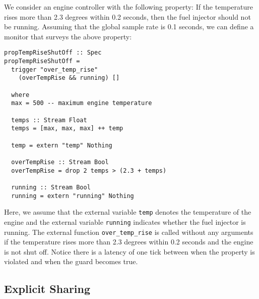 \begin{example}
\label{exm:engine}
We consider an engine controller with the following property: If the temperature
rises more than 2.3 degrees within 0.2 seconds, then the fuel injector should
not be running.  Assuming that the global sample rate is 0.1 seconds, we can
define a monitor that surveys the above property:
%
\begin{lstlisting}[frame=single]
propTempRiseShutOff :: Spec
propTempRiseShutOff = 
  trigger "over_temp_rise" 
    (overTempRise && running) []

  where
  max = 500 -- maximum engine temperature

  temps :: Stream Float
  temps = [max, max, max] ++ temp

  temp = extern "temp" Nothing

  overTempRise :: Stream Bool
  overTempRise = drop 2 temps > (2.3 + temps) 
 
  running :: Stream Bool
  running = extern "running" Nothing
\end{lstlisting}
%

Here, we assume that the external variable {\tt temp} denotes the temperature of
the engine and the external variable {\tt running} indicates whether the fuel
injector is running.  The external function {\tt over\_temp\_rise} is called
without any arguments if the temperature rises more than 2.3 degrees within 0.2
seconds and the engine is not shut off.  Notice there is a latency of one tick between when the property is violated and when the guard becomes true.
\end{example}

\subsection{Explicit Sharing}
\label{sec:explicit_sharing}

